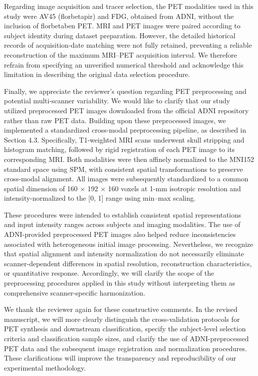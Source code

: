 {Regarding image acquisition and tracer selection, the PET modalities used in this study were AV45 (florbetapir) and FDG, obtained from ADNI, without the inclusion of florbetaben PET. MRI and PET images were paired according to subject identity during dataset preparation. However, the detailed historical records of acquisition-date matching were not fully retained, preventing a reliable reconstruction of the maximum MRI–PET acquisition interval. We therefore refrain from specifying an unverified numerical threshold and acknowledge this limitation in describing the original data selection procedure.

Finally, we appreciate the reviewer’s question regarding PET preprocessing and potential multi-scanner variability. We would like to clarify that our study utilized preprocessed PET images downloaded from the official ADNI repository rather than raw PET data. Building upon these preprocessed images, we implemented a standardized cross-modal preprocessing pipeline, as described in Section 4.3. Specifically, T1-weighted MRI scans underwent skull stripping and histogram matching, followed by rigid registration of each PET image to its corresponding MRI. Both modalities were then affinely normalized to the MNI152 standard space using SPM, with consistent spatial transformations to preserve cross-modal alignment. All images were subsequently standardized to a common spatial dimension of 160 \ensuremath{\times} 192 \ensuremath{\times} 160 voxels at 1-mm isotropic resolution and intensity-normalized to the [0, 1] range using min–max scaling.

These procedures were intended to establish consistent spatial representations and input intensity ranges across subjects and imaging modalities. The use of ADNI-provided preprocessed PET images also helped reduce inconsistencies associated with heterogeneous initial image processing. Nevertheless, we recognize that spatial alignment and intensity normalization do not necessarily eliminate scanner-dependent differences in spatial resolution, reconstruction characteristics, or quantitative response. Accordingly, we will clarify the scope of the preprocessing procedures applied in this study without interpreting them as comprehensive scanner-specific harmonization.

We thank the reviewer again for these constructive comments. In the revised manuscript, we will more clearly distinguish the cross-validation protocols for PET synthesis and downstream classification, specify the subject-level selection criteria and classification sample sizes, and clarify the use of ADNI-preprocessed PET data and the subsequent image registration and normalization procedures. These clarifications will improve the transparency and reproducibility of our experimental methodology.}

